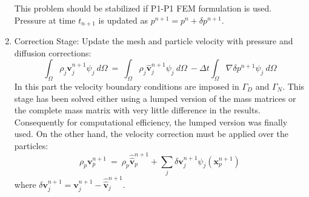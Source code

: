 \begin{enumerate}
 This problem should be stabilized if P1-P1 FEM formulation is used\cite{Idelsohn12b}. Pressure at time $t_{n+1}$ is updated as $p^{n+1}=p^{n}+\delta p^{n+1}$.


 \item Correction Stage: Update the mesh and particle velocity with pressure and diffusion corrections:
 \begin{equation}\label{Step6a}
  \int_{\Omega} \rho_j \mathbf{v}_j^{n+1}\psi_j\ d\Omega \ = \ \int_{\Omega} \rho_j  \widehat{\mathbf{v}}_j^{n+1}\psi_j\ d\Omega\ - \Delta t \int_{\Omega}  \nabla \delta p^{n+1}\psi_j\ d\Omega
 \end{equation}
 In this part the velocity boundary conditions are imposed in $\Gamma_D$ and $\Gamma_N$. This stage has been solved either using a lumped version of the mass matrices or the complete mass matrix with very little difference in the results. Consequently for computational efficiency, the lumped version was finally used. On the other hand, the velocity correction must be applied over the particles:
  \begin{equation}\label{Step6b}
  \rho_p \mathbf{v}_p^{n+1}\  = \ \rho_p \widehat{\widehat{\mathbf{v}}}_p^{n+1} + \sum_{j} \delta \mathbf{v}_j^{n+1} \psi_j(\mathbf{x}_{p}^{n+1})
  \end{equation}
  where $\delta \mathbf{v}_j^{n+1} = \mathbf{v}_j^{n+1}-\widehat{\widehat{\mathbf{v}}}_j^{n+1}$.

\end{enumerate}


